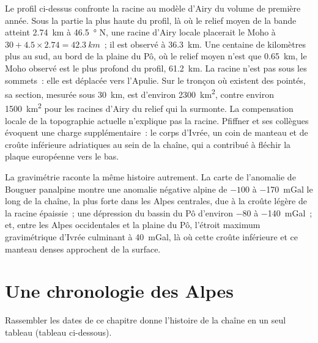 Le profil ci-dessus confronte la racine au modèle d'Airy du volume de première
année. Sous la partie la plus haute du profil, là où le relief moyen de la bande atteint
\qty{2.74}{km} à \qty{46.5}{\degree} N, une racine d'Airy locale placerait le Moho à
$30 + 4.5 \times 2.74 = \qty{42.3}{km}$~; il est observé à \qty{36.3}{km}. Une centaine de
kilomètres plus au sud, au bord de la plaine du Pô, où le relief moyen n'est que
\qty{0.65}{km}, le Moho observé est le plus profond du profil, \qty{61.2}{km}. La racine n'est pas sous les sommets~: elle est
déplacée vers l'Apulie. Sur le tronçon où existent des pointés, sa section, mesurée
sous \qty{30}{km}, est d'environ \qty{2300}{km^2}, contre environ \qty{1500}{km^2} pour les racines d'Airy
du relief qui la surmonte. La compensation locale de la topographie actuelle n'explique pas
la racine. Pfiffner et ses collègues évoquent une charge supplémentaire~: le corps d'Ivrée, un coin de
manteau et de croûte inférieure adriatiques au sein de la chaîne, qui a contribué à fléchir la plaque européenne
vers le bas.

La gravimétrie raconte la même histoire autrement. La carte de l'anomalie de Bouguer panalpine montre une
anomalie négative alpine de $-100$ à \qty{-170}{mGal} le long de la chaîne, la plus forte dans les Alpes centrales,
due à la croûte légère de la racine épaissie~; une dépression du bassin du Pô d'environ $-80$ à
\qty{-140}{mGal}~; et, entre les Alpes occidentales et la plaine du Pô, l'étroit maximum gravimétrique d'Ivrée
culminant à \qty{+40}{mGal}, là où cette croûte inférieure et ce manteau denses approchent de la
surface.

\section{Une chronologie des Alpes}\label{sec:b2:alpine-orogen:timeline}

Rassembler les dates de ce chapitre donne l'histoire de la chaîne en un seul tableau
(tableau ci-dessous).

